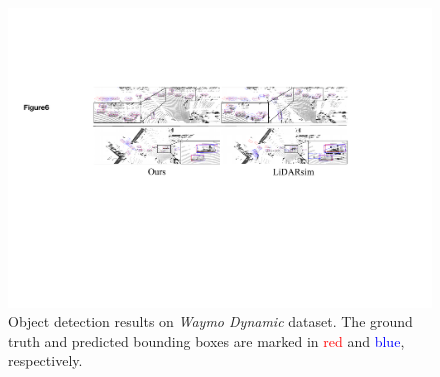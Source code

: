 \begin{figure}[t]
    \centering
        \includegraphics[width=0.8\columnwidth]{Figures/detection_result.pdf}
        \caption{Object detection results on \textit{Waymo Dynamic} dataset. The ground truth and predicted bounding boxes are marked in \textcolor{red}{red} and \textcolor{blue}{blue}, respectively.}
    \label{fig:detection}
    
\end{figure}